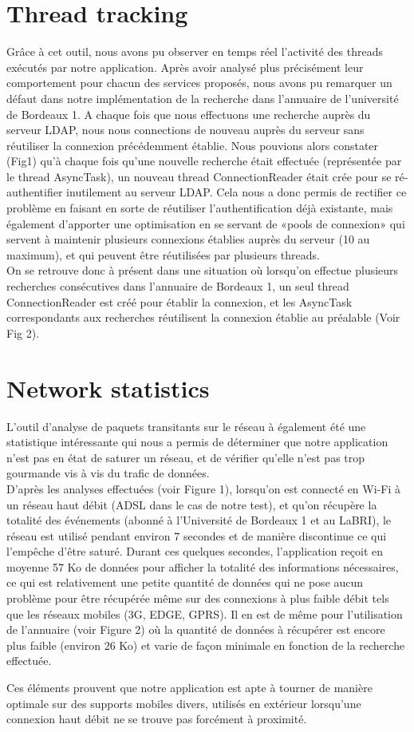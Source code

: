 \section{Thread tracking}
Grâce à cet outil, nous avons pu observer en temps réel l’activité des threads exécutés par notre application. Après avoir analysé plus précisément leur comportement pour chacun des services proposés, nous avons pu remarquer un défaut dans notre implémentation de la recherche dans l’annuaire de l’université de Bordeaux 1. A chaque fois que nous effectuons une recherche auprès du serveur LDAP, nous nous connections de nouveau auprès du serveur sans réutiliser la connexion précédemment établie. Nous pouvions alors constater (Fig1) qu’à chaque fois qu’une nouvelle recherche était effectuée (représentée par le thread AsyncTask), un nouveau thread ConnectionReader  était crée pour se ré-authentifier inutilement au serveur LDAP. Cela nous a donc permis de rectifier ce problème en faisant en sorte de réutiliser l’authentification déjà existante, mais également d’apporter une optimisation en se servant de «pools de connexion» qui servent à maintenir plusieurs connexions établies auprès du serveur (10 au maximum),  et qui peuvent être réutilisées par plusieurs threads.\\
On se retrouve donc à présent dans une situation où lorsqu’on effectue plusieurs recherches consécutives dans l’annuaire de Bordeaux 1, un seul thread ConnectionReader est créé pour établir la connexion, et les AsyncTask correspondants aux recherches réutilisent la connexion établie au préalable (Voir Fig 2).

\section{Network statistics}
L’outil d’analyse de paquets transitants sur le réseau à également été une statistique intéressante qui nous a permis de déterminer que notre application n’est pas en état de saturer un réseau, et de vérifier qu’elle n’est pas trop gourmande vis à vis du trafic de données.\\
D’après les analyses effectuées (voir Figure 1), lorsqu’on est connecté en Wi-Fi à un réseau haut débit (ADSL dans le cas de notre test), et qu’on récupère la totalité des événements (abonné à l’Université de Bordeaux 1 et au LaBRI), le réseau est utilisé pendant environ 7 secondes et de manière discontinue ce qui l’empêche d’être saturé. Durant ces quelques secondes, l’application reçoit en moyenne 57 Ko de données pour afficher la totalité des informations nécessaires, ce qui est relativement une petite quantité de données qui ne pose aucun problème pour être récupérée même sur des connexions à plus faible débit tels que les réseaux mobiles (3G, EDGE, GPRS). 
Il en est de même pour l’utilisation de l’annuaire (voir Figure 2) où la quantité de données à récupérer est encore plus faible (environ 26 Ko) et varie de façon minimale en fonction de la recherche effectuée. 

Ces éléments prouvent que notre application est apte à tourner de manière optimale sur des supports mobiles divers, utilisés en extérieur lorsqu’une connexion haut débit ne se trouve pas forcément à proximité.